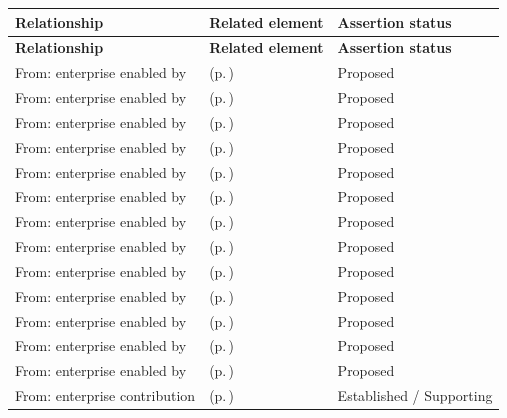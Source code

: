 \begingroup\small\setlength{\TableWidth}{\dimexpr\linewidth-6\tabcolsep-4\arrayrulewidth\relax}
\begin{longtable}{|>{\raggedright\arraybackslash}p{0.27\TableWidth}|>{\raggedright\arraybackslash}p{0.48\TableWidth}|>{\raggedright\arraybackslash}p{0.25\TableWidth}|}
\hline\rowcolor{TableHead}\textbf{Relationship} & \textbf{Related element} & \textbf{Assertion status}\\\hline\endfirsthead
\hline\rowcolor{TableHead}\textbf{Relationship} & \textbf{Related element} & \textbf{Assertion status}\\\hline\endhead
\hline\endfoot
From: enterprise enabled by & \nameref{cap:bec-health-information-exchange} (p.\,\pageref{cap:bec-health-information-exchange}) & Proposed\\\hline
From: enterprise enabled by & \nameref{cap:bec-clinical-communication-administration} (p.\,\pageref{cap:bec-clinical-communication-administration}) & Proposed\\\hline
From: enterprise enabled by & \nameref{cap:bec-population-health-notification-enablement} (p.\,\pageref{cap:bec-population-health-notification-enablement}) & Proposed\\\hline
From: enterprise enabled by & \nameref{cap:bec-clinic-practice-operations} (p.\,\pageref{cap:bec-clinic-practice-operations}) & Proposed\\\hline
From: enterprise enabled by & \nameref{cap:bec-ward-operations} (p.\,\pageref{cap:bec-ward-operations}) & Proposed\\\hline
From: enterprise enabled by & \nameref{cap:bec-theatre-operations} (p.\,\pageref{cap:bec-theatre-operations}) & Proposed\\\hline
From: enterprise enabled by & \nameref{cap:bec-emergency-department-operations} (p.\,\pageref{cap:bec-emergency-department-operations}) & Proposed\\\hline
From: enterprise enabled by & \nameref{cap:bec-outpatient-operations} (p.\,\pageref{cap:bec-outpatient-operations}) & Proposed\\\hline
From: enterprise enabled by & \nameref{cap:bec-mobile-staff-management} (p.\,\pageref{cap:bec-mobile-staff-management}) & Proposed\\\hline
From: enterprise enabled by & \nameref{cap:bec-service-capacity-management} (p.\,\pageref{cap:bec-service-capacity-management}) & Proposed\\\hline
From: enterprise enabled by & \nameref{cap:bec-clinical-collaboration} (p.\,\pageref{cap:bec-clinical-collaboration}) & Proposed\\\hline
From: enterprise enabled by & \nameref{cap:bec-general-collaboration} (p.\,\pageref{cap:bec-general-collaboration}) & Proposed\\\hline
From: enterprise enabled by & \nameref{cap:bec-presentation-services} (p.\,\pageref{cap:bec-presentation-services}) & Proposed\\\hline
From: enterprise contribution & \nameref{cap:bec-assurance-design} (p.\,\pageref{cap:bec-assurance-design}) & Established / Supporting\\\hline
\end{longtable}\endgroup

